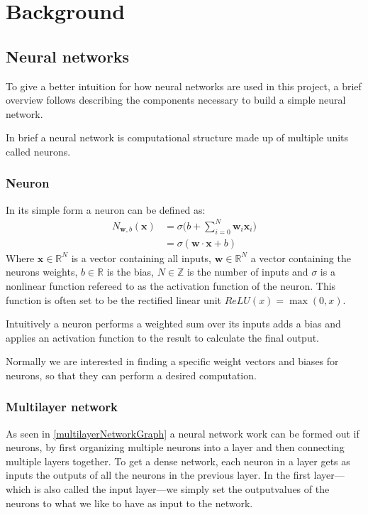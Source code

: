\chapter{Background}
\section{Neural networks}
To give a better intuition for how neural networks are used in this project, a brief overview follows describing the components necessary to build a simple neural network.

In brief a neural network is computational structure made up of multiple units called neurons.

\subsection{Neuron}
In its simple form a neuron can be defined as:
\begin{equation}
\begin{split}
	N_{\boldsymbol w, b}(\boldsymbol{x}) & = \sigma\Bigg(b + \sum_{i=0}^{N}{\boldsymbol{w}_i \boldsymbol{x}_i}\Bigg) \\
	& = \sigma (\boldsymbol{w} \cdot \boldsymbol{x} + b)
\end{split}
\end{equation}
Where $\boldsymbol{x} \in \mathbb{R}^N$ is a vector containing all inputs, $ \boldsymbol{w} \in \mathbb{R}^N$ a vector containing the neurons weights, $b \in \mathbb{R}$ is the bias, $N \in \mathbb{Z}$ is the number of inputs and $\sigma$ is a nonlinear function refereed to as the activation function of the neuron. This function is often set to be the rectified linear unit $ReLU(x) = \max(0, x)$.

Intuitively a neuron performs a weighted sum over its inputs adds a bias and applies an activation function to the result to calculate the final output.

Normally we are interested in finding a specific weight vectors and biases for neurons, so that they can perform a desired computation.
\clearpage

\subsection{Multilayer network}
As seen in \ref{multilayerNetworkGraph} a neural network work can be formed out if neurons, by first organizing multiple neurons into a layer and then connecting multiple layers together. To get a dense network, each neuron in a layer gets as inputs the outputs of all the neurons in the previous layer. In the first layer---which is also called the input layer---we simply set the outputvalues of the neurons to what we like to have as input to the network.
\vspace*{\fill}
\multilayerNetworkGraph

